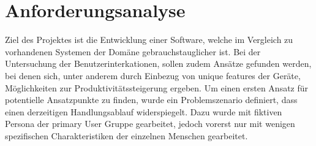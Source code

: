 
\section{Anforderungsanalyse}
Ziel des Projektes ist die Entwicklung einer Software, welche im Vergleich zu vorhandenen Systemen der Domäne gebrauchstauglicher ist. Bei der Untersuchung der Benutzerinterkationen, sollen zudem Ansätze gefunden werden, bei denen sich, unter anderem durch Einbezug von unique features der Geräte, Möglichkeiten zur Produktivitätssteigerung ergeben. 
Um einen ersten Ansatz für potentielle Ansatzpunkte zu finden, wurde ein Problemszenario definiert, dass einen derzeitigen Handlungsablauf widerspiegelt. Dazu wurde mit fiktiven Persona der primary User Gruppe gearbeitet, jedoch vorerst nur mit wenigen spezifischen Charakteristiken der einzelnen Menschen gearbeitet.\\

